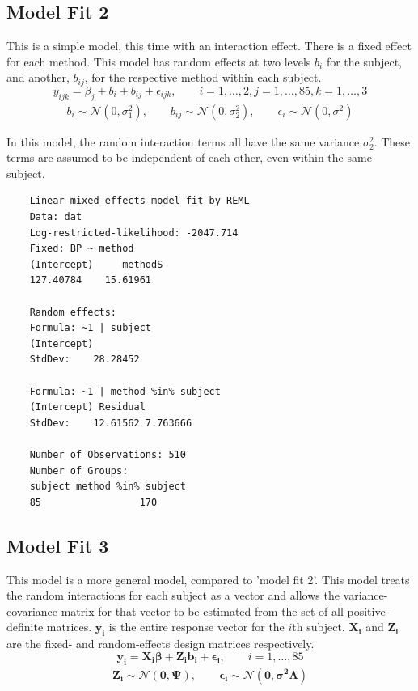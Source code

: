 \documentclass[12pt, a4paper]{report}
\theoremstyle{plain}
\theoremstyle{definition}
\theoremstyle{remark}
\begin{document}
	\newpage
	
	\subsection{Model Fit 2}
	
	This is a simple model, this time with an interaction effect.
	There is a fixed effect for each method. This model has random effects at two levels $b_{i}$ for the subject, and
	another, $b_{ij}$, for the respective method within each subject.
	\begin{equation*}
	y_{ijk} = \beta_{j}  + b_{i} + b_{ij} + \epsilon_{ijk}, \qquad i=1,\dots,2, j=1,\dots,85, k=1,\dots,3
	\end{equation*}
	\begin{eqnarray*}
		b_{i} \sim \mathcal{N}(0,\sigma^2_{1}), \qquad b_{ij} \sim \mathcal{N}(0,\sigma^2_{2}), \qquad \epsilon_{i} \sim \mathcal{N}(0,\sigma^2)
	\end{eqnarray*}
	
	In this model, the random interaction terms all have the same variance $\sigma^2_{2}$. These terms are assumed to be independent of each other, even
	within the same subject.
	
	\begin{verbatim}
	Linear mixed-effects model fit by REML
	Data: dat
	Log-restricted-likelihood: -2047.714
	Fixed: BP ~ method
	(Intercept)     methodS
	127.40784    15.61961
	
	Random effects:
	Formula: ~1 | subject
	(Intercept)
	StdDev:    28.28452
	
	Formula: ~1 | method %in% subject
	(Intercept) Residual
	StdDev:    12.61562 7.763666
	
	Number of Observations: 510
	Number of Groups:
	subject method %in% subject
	85                 170
	\end{verbatim}
	\newpage
	
	\subsection{Model Fit 3}
	
	This model is a more general model, compared to 'model fit 2'. This model treats the random interactions for each subject as a vector and
	allows the variance-covariance matrix for that vector to be estimated from the set of all positive-definite matrices.
	$\boldsymbol{y_{i}}$ is the entire response vector for the $i$th subject.
	$\boldsymbol{X_{i}}$ and $\boldsymbol{Z_{i}}$  are the fixed- and random-effects design matrices respectively.
	\begin{equation*}
	\boldsymbol{y_{i}} = \boldsymbol{X_{i}\beta}  + \boldsymbol{Z_{i}b_{i}} + \boldsymbol{\epsilon_{i}}, \qquad i=1,\dots,85
	\end{equation*}
	\begin{eqnarray*}
		\boldsymbol{Z_{i}} \sim \mathcal{N}(\boldsymbol{0,\Psi}),\qquad
		\boldsymbol{\epsilon_{i}} \sim \mathcal{N}(\boldsymbol{0,\sigma^2\Lambda})
	\end{eqnarray*}
	
\end{document}
